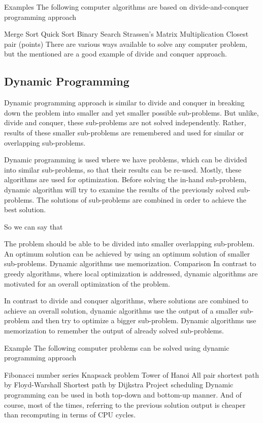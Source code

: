Examples
The following computer algorithms are based on divide-and-conquer programming approach

Merge Sort
Quick Sort
Binary Search
Strassen's Matrix Multiplication
Closest pair (points)
There are various ways available to solve any computer problem, but the mentioned are a good example of divide and conquer approach.

\subsection{Dynamic Programming}

Dynamic programming approach is similar to divide and conquer in breaking down the problem into smaller and yet smaller possible sub-problems. But unlike, divide and conquer, these sub-problems are not solved independently. Rather, results of these smaller sub-problems are remembered and used for similar or overlapping sub-problems.

Dynamic programming is used where we have problems, which can be divided into similar sub-problems, so that their results can be re-used. Mostly, these algorithms are used for optimization. Before solving the in-hand sub-problem, dynamic algorithm will try to examine the results of the previously solved sub-problems. The solutions of sub-problems are combined in order to achieve the best solution.

So we can say that

The problem should be able to be divided into smaller overlapping sub-problem.
An optimum solution can be achieved by using an optimum solution of smaller sub-problems.
Dynamic algorithms use memorization.
Comparison
In contrast to greedy algorithms, where local optimization is addressed, dynamic algorithms are motivated for an overall optimization of the problem.

In contrast to divide and conquer algorithms, where solutions are combined to achieve an overall solution, dynamic algorithms use the output of a smaller sub-problem and then try to optimize a bigger sub-problem. Dynamic algorithms use memorization to remember the output of already solved sub-problems.

Example
The following computer problems can be solved using dynamic programming approach

Fibonacci number series
Knapsack problem
Tower of Hanoi
All pair shortest path by Floyd-Warshall
Shortest path by Dijkstra
Project scheduling
Dynamic programming can be used in both top-down and bottom-up manner. And of course, most of the times, referring to the previous solution output is cheaper than recomputing in terms of CPU cycles.

